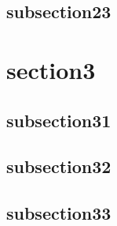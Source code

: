 \documentclass{article}
\begin{document}
\lipsum[100]


\color{blue}
\subsection{
subsection23
}
\color{black}

\lipsum[100]


\color{red}
\section{
section3
}
\color{blue}
\subsection{
subsection31
}
\color{black}

\lipsum[100]

\color{blue}
\subsection{
subsection32
}
\color{black}

\lipsum[100]

\color{blue}
\subsection{
subsection33
}
\color{black}

\lipsum[100]
\end{document}
